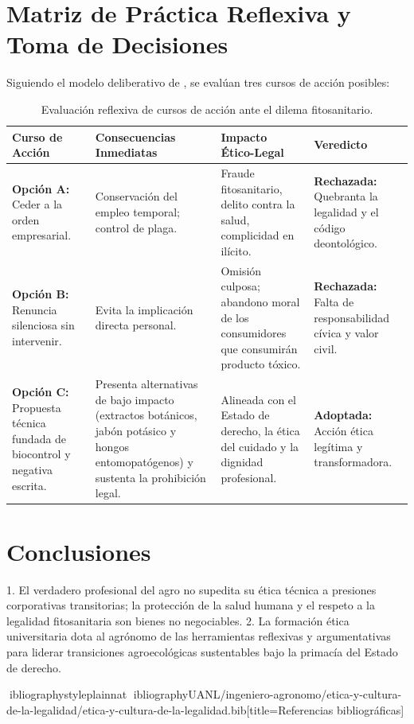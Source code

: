 \documentclass[spanish,letterpaper,oneside]{article}
\begin{document}
\section{Matriz de Práctica Reflexiva y Toma de Decisiones}
Siguiendo el modelo deliberativo de \textcite{giusti2018}, se evalúan tres cursos de acción posibles:

\begin{table}[htbp]
\centering
\small
\caption{Evaluación reflexiva de cursos de acción ante el dilema fitosanitario.}
\label{tab:dilema-agroquimicos}
\begin{tabularx}{\textwidth}{@{}l Y Y Y@{}}
\toprule
\textbf{Curso de Acción} & \textbf{Consecuencias Inmediatas} & \textbf{Impacto Ético-Legal} & \textbf{Veredicto} \\
\midrule
\textbf{Opción A:} Ceder a la orden empresarial. & Conservación del empleo temporal; control de plaga. & Fraude fitosanitario, delito contra la salud, complicidad en ilícito. & \textbf{Rechazada:} Quebranta la legalidad y el código deontológico. \\
\addlinespace
\textbf{Opción B:} Renuncia silenciosa sin intervenir. & Evita la implicación directa personal. & Omisión culposa; abandono moral de los consumidores que consumirán producto tóxico. & \textbf{Rechazada:} Falta de responsabilidad cívica y valor civil. \\
\addlinespace
\textbf{Opción C:} Propuesta técnica fundada de biocontrol y negativa escrita. & Presenta alternativas de bajo impacto (extractos botánicos, jabón potásico y hongos entomopatógenos) y sustenta la prohibición legal. & Alineada con el Estado de derecho, la ética del cuidado y la dignidad profesional. & \textbf{Adoptada:} Acción ética legítima y transformadora. \\
\bottomrule
\end{tabularx}
\end{table}

\section{Conclusiones}
1. El verdadero profesional del agro no supedita su ética técnica a presiones corporativas transitorias; la protección de la salud humana y el respeto a la legalidad fitosanitaria son bienes no negociables.
2. La formación ética universitaria dota al agrónomo de las herramientas reflexivas y argumentativas para liderar transiciones agroecológicas sustentables bajo la primacía del Estado de derecho.

\newpage
ibliographystyle{plainnat}
ibliography{UANL/ingeniero-agronomo/etica-y-cultura-de-la-legalidad/etica-y-cultura-de-la-legalidad.bib}[title={Referencias bibliográficas}]
\end{document}
